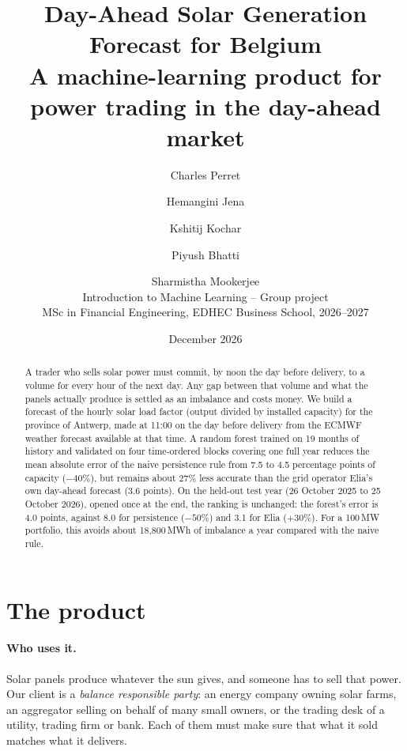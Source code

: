 \documentclass[11pt,a4paper]{article}
\title{\textbf{Day-Ahead Solar Generation Forecast for Belgium}\\[4pt]
\large A machine-learning product for power trading in the day-ahead market}
\author{Charles Perret \and Hemangini Jena \and Kshitij Kochar \and Piyush Bhatti \and Sharmistha Mookerjee\\[6pt]
\small Introduction to Machine Learning -- Group project\\
\small MSc in Financial Engineering, EDHEC Business School, 2026--2027}
\date{December 2026}
\begin{document}
\maketitle

\begin{abstract}
\noindent
A trader who sells solar power must commit, by noon the day before delivery, to a volume for every
hour of the next day. Any gap between that volume and what the panels actually produce is settled
as an imbalance and costs money. We build a forecast of the hourly solar load factor (output
divided by installed capacity) for the province of Antwerp, made at 11:00 on the day before
delivery from the ECMWF weather forecast available at that time. A random forest trained on
19 months of history and validated on four time-ordered blocks covering one full year reduces the
mean absolute error of the naive persistence rule from 7.5 to 4.5 percentage points of capacity
($-40\%$), but remains about 27\% less accurate than the grid operator Elia's own day-ahead forecast
(3.6 points). On the held-out test year (26 October 2025 to 25 October 2026), opened once at the
end, the ranking is unchanged: the forest's error is 4.0 points, against 8.0 for persistence ($-50\%$)
and 3.1 for Elia ($+30\%$). For a 100\,MW portfolio, this avoids about 18,800\,MWh of imbalance a year
compared with the naive rule.
\end{abstract}




\section{The product}
\label{sec:product}

\paragraph{Who uses it.}
Solar panels produce whatever the sun gives, and someone has to sell that power. Our client is a
\emph{balance responsible party}: an energy company owning solar farms, an aggregator selling on
behalf of many small owners, or the trading desk of a utility, trading firm or bank. Each of them
must make sure that what it sold matches what it delivers.
\end{document}
